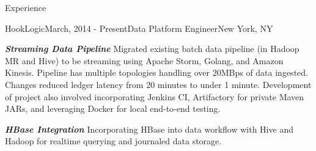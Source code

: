 \documentclass{resume} %
\begin{document}
\begin{rSection}{Experience}

    \begin{rSubsection}{HookLogic}{March, 2014 - Present}{Data Platform Engineer}{New York, NY}
    \item \textbf{\textit{Streaming Data Pipeline}} Migrated existing batch data pipeline (in Hadoop MR and Hive) to be streaming using Apache Storm, Golang, and Amazon Kinesis.  Pipeline has multiple topologies handling over 20MBps of data ingested.  Changes reduced ledger latency from 20 minutes to under 1 minute.  Development of project also involved incorporating Jenkins CI, Artifactory for private Maven JARs, and leveraging Docker for local end-to-end testing.
    \item \textbf{\textit{HBase Integration}} Incorporating HBase into data workflow with Hive and Hadoop for realtime querying and journaled data storage.
   
    \end{rSubsection}


\end{rSection}
\end{document}
